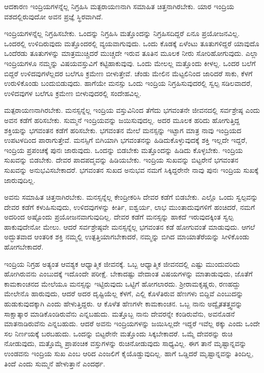 \begin{artha}
ಆದಕಾರಣ ಇಂದ್ರಿಯಗಳನ್ನೆಲ್ಲ ನಿಗ್ರಹಿಸಿ ಮತ್ಪರಾಯಣನಾಗಿ ಸಮಾಹಿತ ಚಿತ್ತನಾಗಿರಬೇಕು. ಯಾರ ಇಂದ್ರಿಯ ವಶದಲ್ಲಿರುವುದೋ ಅವನ ಪ್ರಜ್ಞೆ ಸ್ಥಿರವಾಗಿದೆ.
\end{artha}

ಇಂದ್ರಿಯಗಳನ್ನೆಲ್ಲ ನಿಗ್ರಹಿಸಬೇಕು. ಒಂದನ್ನು ನಿಗ್ರಹಿಸಿ ಮತ್ತೊಂದನ್ನು ನಿಗ್ರಹಿಸ\-ದಿದ್ದರೆ ಏನೂ ಪ್ರಯೋಜನವಿಲ್ಲ. ಒಂದರಲ್ಲಿ ಉಳಿದಿರುವುದು ಮತ್ತೊಂದರಲ್ಲಿ ವ್ಯಯವಾಗುವುದು. ಒಂದು ಕೊಡಕ್ಕೆ ಏಳೆಂಟು ತೂತುಗಳಿದ್ದರೆ ಯಾವುದೊ ಒಂದೆರಡು ತೂತುಗಳನ್ನು ಮಾತ್ರ\break ಮುಚ್ಚಿದರೆ ಮುಚ್ಚದೇ ಇರುವ ತೂತಿನ ಮೂಲಕ ನೀರು ಸೋರಿಹೋಗುವುದು. ಎಲ್ಲಾ ಇಂದ್ರಿಯಗಳೂ ನಮ್ಮನ್ನು ವಿಷಯವಸ್ತುವಿಗೆ ಕಟ್ಟಿಹಾಕುವುವು. ಒಂದು ಮೇಲಲ್ಲ ಮತ್ತೊಂದು ಕೀಳಲ್ಲ. ಒಂದರ ಬಲೆಗೆ ಬಿದ್ದರೆ ಉಳಿದವುಗಳೆಲ್ಲದರ ಬಲೆಗೂ ಕ್ರಮೇಣ ಬೀಳುತ್ತೇವೆ. ಚೆಂಡು ಮೇಲಿನ ಮೆಟ್ಟಲಿನಿಂದ ಜಾರಿದರೆ ಸಾಕು, ಕೆಳಗೆ ಉರುಳಿಕೊಂಡು ಬಂದುಬಿಡುವುದು. ಹಾಗೆಯೇ ಮನಸ್ಸು ಒಂದು ಇಂದ್ರಿಯ ನಿಗ್ರಹಿಸುವುದರಲ್ಲಿ ಸ್ವಲ್ಪ ಸಡಿಲವಾದರೆ, ಉಳಿದವುಗಳ ಬಲೆಗೂ ಕ್ರಮೇಣ ಬೀಳುವುದರಲ್ಲಿ ಸಂದೇಹವಿಲ್ಲ.

ಮತ್ಪರಾಯಣನಾಗಿರಬೇಕು. ಮನಸ್ಸನ್ನೆಲ್ಲ ಇಂದ್ರಿಯ ವಸ್ತುವಿನಿಂದ ತೆಗೆದು ಭಗವಂತನೇ ಜೀವನದಲ್ಲಿ ಸರ್ವಶ್ರೇಷ್ಠ ಎಂದು ಅವನ ಕಡೆಗೆ ಹರಿಸಬೇಕು. ಸುಮ್ಮನೆ ಇಂದ್ರಿಯವನ್ನು ಜಯಿಸುವುದಲ್ಲ. ಅದರ ಮೂಲಕ ಹರಿದು ಹೋಗುತ್ತಿದ್ದ ಶಕ್ತಿಯನ್ನು ಭಗವಂತನ ಕಡೆಗೆ ಹರಿಸಬೇಕು. ಭಗವಂತನ ಮೇಲೆ ಮನಸ್ಸನ್ನು ಇಟ್ಟಾಗ ಮಾತ್ರ ನಾವು ಇಂದ್ರಿಯದ ಉಪಟಳದಿಂದ ಪಾರಾಗುತ್ತೇವೆ. ಮನಸ್ಸಿಗೆ ಬಿಗಿಯಾಗಿ ಭಗವಂತನನ್ನು ಹಿಡಿದುಕೊಳ್ಳುವುದಕ್ಕೆ ಶಕ್ತಿ ಇಲ್ಲದೇ ಇದ್ದರೆ, ಇಂದ್ರಿಯ ಪ್ರಪಂಚಕ್ಕೆ ಪುನಃ ಜಾರುವುದು. ಒಂದನ್ನು ಬಿಡಬೇಕು ಮತ್ತೊಂದನ್ನು ಹಿಡಿದು ಕೊಳ್ಳಬೇಕು. ಇಂದ್ರಿಯ ಸುಖವನ್ನು ಬಿಡಬೇಕು. ದೇವರ ಪಾದಪದ್ಮವನ್ನು ಹಿಡಿಯಬೇಕು. ಇಂದ್ರಿಯ ಸುಖವನ್ನು ಬಿಟ್ಟರೇನೆ ಭಗವಂತನ ಸುಖವನ್ನು ಅನುಭವಿಸಬೇಕಾದರೆ. ಭಗವಂತನ ಸುಖದ ಅನುಭವ ನಮಗೆ ಸಿಕ್ಕಿದ್ದರೇನೇ ನಾವು ಪುನಃ ಇಂದ್ರಿಯ ಸುಖಕ್ಕೆ ಜಾರುವುದಿಲ್ಲ.

ಅವನು ಸಮಾಹಿತ ಚಿತ್ತನಾಗಿರಬೇಕು. ಮನಸ್ಸನ್ನೆಲ್ಲ ಕೇಂದ್ರೀಕರಿಸಿ ದೇವರ ಕಡೆಗೆ ಬಿಡಬೇಕು. ಎಲ್ಲೊ ಒಂದು ಸ್ವಲ್ಪವನ್ನು ದೇವರ ಕಡೆಗೆ ಕಳುಹಿಸುವುದು, ಉಳಿದವುಗಳನ್ನು ಕೀರ್ತಿ, ಐಶ್ವರ್ಯ, ಲಾಭ ಮುಂತಾದುವುಗಳಿಗೆ ಹಂಚಿದರೆ, ನಮಗೆ ಅದರಿಂದ ಅಷ್ಟೊಂದು ಪ್ರಯೋಜನವಾಗುವುದಿಲ್ಲ. ದೇವರ ಕಡೆಗೆ ಮನಸ್ಸನ್ನು ಹಾಕದೆ ಇರುವುದಕ್ಕಿಂತ ಸ್ವಲ್ಪ ಹಾಕುವುದೇನೋ ಮೇಲು. ಆದರೆ ಸರ್ವಶ್ರೇಷ್ಠವೇ ಮನಸ್ಸನ್ನೆಲ್ಲ ಭಗವಂತನ ಕಡೆ ಹೋಗುವಂತೆ ಮಾಡುವುದು. ಆಗಲೆ ಅದ್ಭುತವಾದ ಆಂತರಿಕ ಶಕ್ತಿ ನಮ್ಮಲ್ಲಿ ಉತ್ಪತ್ತಿಯಾಗಬೇಕಾದರೆ, ನಮ್ಮನ್ನು ಬಿಗಿದ ಮಾಯಾತೆರೆಯನ್ನು ಸೀಳಿಕೊಂಡು ಹೋಗಬೇಕಾದರೆ.

ಇಂದ್ರಿಯ ನಿಗ್ರಹ ಅತ್ಯಂತ ಆವಶ್ಯಕ ಆಧ್ಯಾತ್ಮಿಕ ಜೀವನಕ್ಕೆ. ಒಬ್ಬ ಆಧ್ಯಾತ್ಮಿಕ ಜೀವನದಲ್ಲಿ ಎಷ್ಟು ಮುಂದುವರಿದು ಹೋಗಿರುವನು ಎಂಬುದಕ್ಕೆ ಇದೊಂದೇ ಪರೀಕ್ಷೆ. ಬೇಕಾದಷ್ಟು ವೇದಾಂತ ವಿಷಯಗಳನ್ನು ಮಾತಾಡುವುದು, ಜೊತೆಗೆ ಕಾಮಕಾಂಚನದ ಮೇಲೆಯೂ ಮನಸ್ಸನ್ನು ಇಟ್ಟಿರುವುದು ಒಟ್ಟಿಗೆ ಹೋಗಲಾರದು. ಶ‍್ರೀರಾಮಕೃಷ್ಣರು, ರಣಹದ್ದು ಮೇಲೇನೊ ಹಾರುವುದು, ಆದರೆ ಅದರ ದೃಷ್ಟಿಯೆಲ್ಲ ಕೆಳಗೆ, ಎಲ್ಲಿ ಕೊಳೆತಿರುವ ಹೆಣಗಳು ಬಿದ್ದಿವೆ ಎಂಬುದನ್ನು ಹುಡುಕುವುದಕ್ಕಾಗಿ ಎಂದು ಹೇಳುತ್ತಿದ್ದರು. ಆ ಕೊಳೆತ ಹೆಣಗಳೇ ಕಾಮಕಾಂಚನ. ಒಬ್ಬ ನಾನು ಅದ್ವೈತತತ್ತ್ವವನ್ನು ಸಾಕ್ಷಾತ್ಕಾರ ಮಾಡಿಕೊಂಡಿರುವೆನು ಎನ್ನಬಹುದು. ಮತ್ತೊಬ್ಬ ನಾನು ದೇವರನ್ನೇ ಕಂಡಿರುವೆನು, ಅವನೊಡನೆ ಮಾತನಾಡಿರುವೆನು ಎನ್ನಬಹುದು. ಆದರೆ ಅವನು ಇಂದ್ರಿಯಗಳನ್ನು ಜಯಿಸಿಲ್ಲದೇ ಇದ್ದರೆ ಇವೆಲ್ಲ ಠಕ್ಕು ಎಂದು ಒಂದೇ ಸಲ ನಿರ್ಣಯಕ್ಕೆ ಬರಬಹುದು. ಒಂದನ್ನು ಬಿಟ್ಟರೇನೇ ಮತ್ತೊಂದು ಸಿಕ್ಕಬೇಕಾದರೆ. ಒಮ್ಮೆ ದೇವರನ್ನು ರುಚಿ ನೋಡುವುದು, ಮತ್ತೊಮ್ಮೆ ಪ್ರಾಪಂಚಿಕ ವಸ್ತುಗಳನ್ನು ರುಚಿನೋಡುವುದು ಸಾಧ್ಯವಿಲ್ಲ. ಈಗ ತಾನೆ ಮೃಷ್ಟಾನ್ನವನ್ನು ಉಂಡವನು ಇಂದ್ರಿಯ ಸುಖ ಎಂಬ ಆರಿದ ಎಂಜಲಿಗೆ ಕೈಯೊಡ್ಡುವುದಿಲ್ಲ. ಹಾಗೆ ಒಡ್ಡಿದರೆ ಮೃಷ್ಟಾನ್ನವನ್ನು ತಿಂದಿಲ್ಲ, ತಿಂದೆ ಎಂದು ಸುಮ್ಮನೆ ಹೇಳುತ್ತಾನೆ ಎಂದರ್ಥ.

